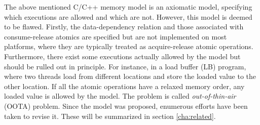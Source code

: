 The above mentioned C/C++ memory model is an axiomatic model, specifying which executions are allowed and which are not. However, this model is deemed to be flawed. Firstly, the data-dependency relation and those associated with consume-release atomics are specified but are not implemented on most platforms, where they are typically treated as acquire-release atomic operations. Furthermore, there exist some executions actually allowed by the model but should be rulled out in principle.  For instance, in a load buffer (LB) program, where two threads load from different locations and store the loaded value to the other location. If all the atomic operations have a relaxed memory order, any loaded value is allowed by the model. The problem is called \textit{out-of-thin-air} (OOTA) problem. Since the model was proposed, enumerous efforts have been taken to revise it. These will be summarized in section \ref{cha:related}.



